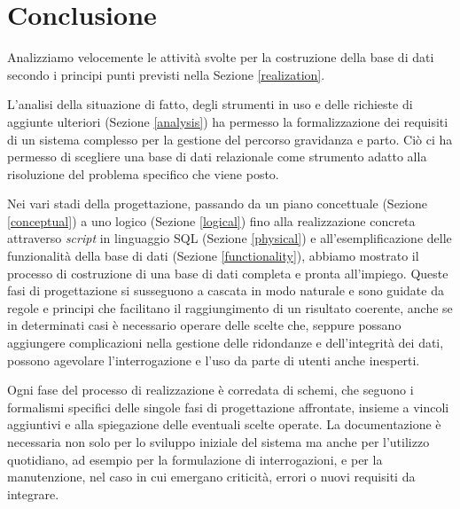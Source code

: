 \chapter{Conclusione}

Analizziamo velocemente le attività svolte per la costruzione della base di dati secondo i principi punti previsti nella Sezione \ref{realization}.

L'analisi della situazione di fatto, degli strumenti in uso e delle richieste di aggiunte ulteriori (Sezione \ref{analysis}) ha permesso la formalizzazione dei requisiti di un sistema complesso per la gestione del percorso gravidanza e parto.
Ciò ci ha permesso di scegliere una base di dati relazionale come strumento adatto alla risoluzione del problema specifico che viene posto.

Nei vari stadi della progettazione, passando da un piano concettuale (Sezione \ref{conceptual}) a uno logico (Sezione \ref{logical}) fino alla realizzazione concreta attraverso \emph{script} in linguaggio SQL (Sezione \ref{physical}) e all'esemplificazione delle funzionalità della base di dati (Sezione \ref{functionality}), abbiamo mostrato il processo di costruzione di una base di dati completa e pronta all'impiego.
Queste fasi di progettazione si susseguono a cascata in modo naturale e sono guidate da regole e principi che facilitano il raggiungimento di un risultato coerente, anche se in determinati casi è necessario operare delle scelte che, seppure possano aggiungere complicazioni nella gestione delle ridondanze e dell'integrità dei dati, possono agevolare l'interrogazione e l'uso da parte di utenti anche inesperti.

Ogni fase del processo di realizzazione è corredata di schemi, che seguono i formalismi specifici delle singole fasi di progettazione affrontate, insieme a vincoli aggiuntivi e alla spiegazione delle eventuali scelte operate.
La documentazione è necessaria non solo per lo sviluppo iniziale del sistema ma anche per l'utilizzo quotidiano, ad esempio per la formulazione di interrogazioni, e per la manutenzione, nel caso in cui emergano criticità, errori o nuovi requisiti da integrare.

